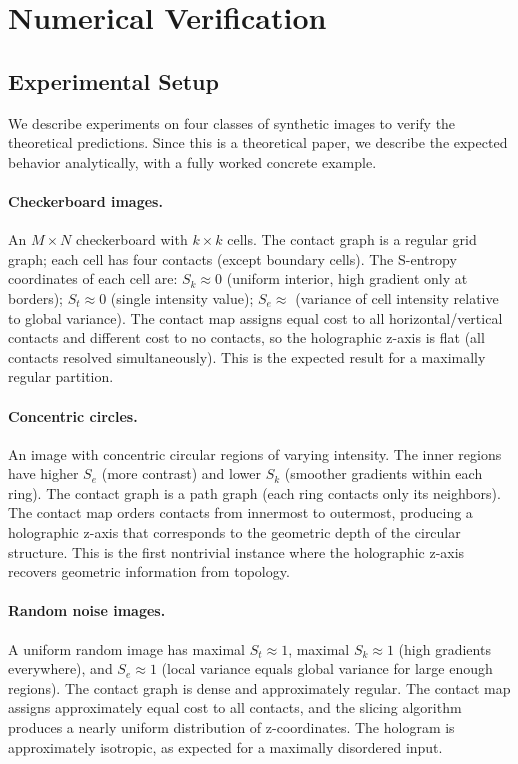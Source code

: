 \documentclass[twocolumn]{article}
\theoremstyle{plain}
\theoremstyle{definition}
\newcommand{\Sk}{S_k}
\newcommand{\St}{S_t}
\newcommand{\Se}{S_e}
\begin{document}
\section{Numerical Verification}
\label{sec:numerical}

\subsection{Experimental Setup}

We describe experiments on four classes of synthetic images to verify the
theoretical predictions. Since this is a theoretical paper, we describe the
expected behavior analytically, with a fully worked concrete example.

\paragraph{Checkerboard images.} An $M \times N$ checkerboard with $k \times k$
cells. The contact graph is a regular grid graph; each cell has four contacts
(except boundary cells). The S-entropy coordinates of each cell are:
$\Sk \approx 0$ (uniform interior, high gradient only at borders); $\St \approx 0$
(single intensity value); $\Se \approx$ (variance of cell intensity relative to
global variance). The contact map assigns equal cost to all horizontal/vertical
contacts and different cost to no contacts, so the holographic z-axis is flat
(all contacts resolved simultaneously). This is the expected result for a
maximally regular partition.

\paragraph{Concentric circles.} An image with concentric circular regions of
varying intensity. The inner regions have higher $\Se$ (more contrast) and lower
$\Sk$ (smoother gradients within each ring). The contact graph is a path graph
(each ring contacts only its neighbors). The contact map orders contacts from
innermost to outermost, producing a holographic z-axis that corresponds to the
geometric depth of the circular structure. This is the first nontrivial instance
where the holographic z-axis recovers geometric information from topology.

\paragraph{Random noise images.} A uniform random image has maximal $\St \approx 1$,
maximal $\Sk \approx 1$ (high gradients everywhere), and $\Se \approx 1$ (local
variance equals global variance for large enough regions). The contact graph is
dense and approximately regular. The contact map assigns approximately equal
cost to all contacts, and the slicing algorithm produces a nearly uniform
distribution of z-coordinates. The hologram is approximately isotropic, as
expected for a maximally disordered input.
\end{document}
